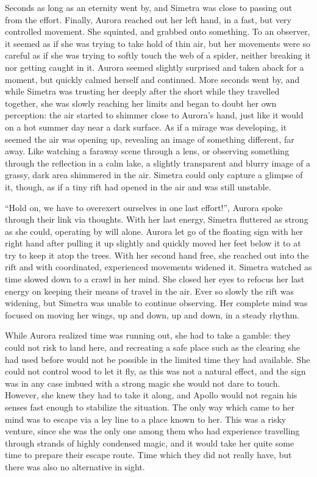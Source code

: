 Seconds as long as an eternity went by, and Simetra was close to passing out from the effort. Finally, Aurora reached out her left hand, in a fast, but very controlled movement. She squinted, and grabbed onto something. To an observer, it seemed as if she was trying to take hold of thin air, but her movements were so careful as if she was trying to softly touch the web of a spider, neither breaking it nor getting caught in it. Aurora seemed slightly surprised and taken aback for a moment, but quickly calmed herself and continued. More seconds went by, and while Simetra was trusting her deeply after the short while they travelled together, she was slowly reaching her limits and began to doubt her own perception: the air started to shimmer close to Aurora's hand, just like it would on a hot summer day near a dark surface. As if a mirage was developing, it seemed the air was opening up, revealing an image of something different, far away. Like watching a faraway scene through a lens, or observing something through the reflection in a calm lake, a slightly transparent and blurry image of a grassy, dark area shimmered in the air. Simetra could only capture a glimpse of it, though, as if a tiny rift had opened in the air and was still unstable.

\enquote{Hold on, we have to overexert ourselves in one last effort!}, Aurora spoke through their link via thoughts. With her last energy, Simetra fluttered as strong as she could, operating by will alone. Aurora let go of the floating sign with her right hand after pulling it up slightly and quickly moved her feet below it to at try to keep it atop the trees. With her second hand free, she reached out into the rift and with coordinated, experienced movements widened it. Simetra watched as time slowed down to a crawl in her mind. She closed her eyes to refocus her last energy on keeping their means of travel in the air. Ever so slowly the rift was widening, but Simetra was unable to continue observing. Her complete mind was focused on moving her wings, up and down, up and down, in a steady rhythm.

\froufrou{}

While Aurora realized time was running out, she had to take a gamble: they could not risk to land here, and recreating a safe place such as the clearing she had used before would not be possible in the limited time they had available. She could not control wood to let it fly, as this was not a natural effect, and the sign was in any case imbued with a strong magic she would not dare to touch. However, she knew they had to take it along, and Apollo would not regain his senses fast enough to stabilize the situation. The only way which came to her mind was to escape via a ley line to a place known to her. This was a risky venture, since she was the only one among them who had experience travelling through strands of highly condensed magic, and it would take her quite some time to prepare their escape route. Time which they did not really have, but there was also no alternative in sight.

